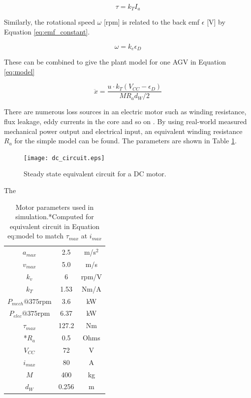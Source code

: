 \begin{equation}
\tau = k_T I_a
\label{eq:torque_constant}
\end{equation} 

Similarly, the rotational speed $\omega$ [rpm] is related to the back emf $\epsilon$ [V] by Equation \ref{eq:emf_constant}.

\begin{equation}
\omega = {k_e}\epsilon_D 
\label{eq:emf_constant}
\end{equation}

These can be combined to give the plant model for one AGV in Equation \ref{eq:model}

\begin{equation}
\ddot{x} =\frac{ u \cdot k_T (V_{CC} - \epsilon_D) }{M R_a d_W/2}
\label{eq:model}
\end{equation}

 There are numerous loss sources in an electric motor such as winding resistance, flux leakage, eddy currents in the core and so on \cite{Sarlioglu2016}. By using real-world measured mechanical power output and electrical input, an equivalent winding resistance $R_a$ for the simple model can be found. The parameters are shown in Table \ref{tab:motor_params}.

\begin{figure}[ht]
	\centering
	\texttt{[image: dc\_circuit.eps]}
	\caption{Steady state equivalent circuit for a DC motor.}
	\label{fig:dc_circuit}
\end{figure}

The 

 \begin{table}
 	\caption{Motor parameters used in simulation.*Computed for equivalent circuit in Equation {eq:model} to match $\tau_{max}$ at $i_{max}$}
 	\label{tab:motor_params} 
 	\centering
 	\begin{tabular}{ |c|c|c| }
 		\hline
 		$a_{max}$ & 2.5 & m/s$^2$\\
 		$v_{max}$ & 5.0& m/s \\
 		$k_v$ & 6 & rpm/V\\ 
 		$k_T$ & 1.53 & Nm/A\\ 
 		$P_{mech}@375$rpm & 3.6 & kW\\ 
 		$P_{elec}@375$rpm & 6.37 & kW \\
 		$\tau_{max}$ & 127.2 & Nm\\
 		*$R_a$ & 0.5 & Ohms\\
 		$V_{CC}$ & 72 & V\\
 		$i_{max}$ & 80 & A\\
 		$M$ & 400 & kg\\
 		$d_W$ & 0.256 & m\\
 		\hline
 	\end{tabular}
 \end{table}

